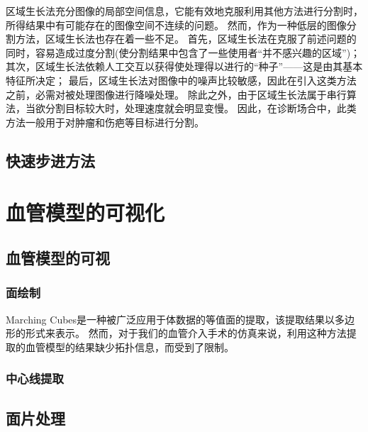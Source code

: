 区域生长法充分图像的局部空间信息，它能有效地克服利用其他方法进行分割时，所得结果中有可能存在的图像空间不连续的问题。
然而，作为一种低层的图像分割方法，区域生长法也存在着一些不足。
首先，区域生长法在克服了前述问题的同时，容易造成过度分割(使分割结果中包含了一些使用者“并不感兴趣的区域”)；
其次，区域生长法依赖人工交互以获得使处理得以进行的“种子”——这是由其基本特征所决定；
最后，区域生长法对图像中的噪声比较敏感，因此在引入这类方法之前，必需对被处理图像进行降噪处理。
除此之外，由于区域生长法属于串行算法，当欲分割目标较大时，处理速度就会明显变慢。
因此，在诊断场合中，此类方法一般用于对肿瘤和伤疤等目标进行分割。

\subsection{快速步进方法}

\cite{Sethian1996FastMarching} \cite{Osher1988LevelSet}


\section{血管模型的可视化}

\subsection{血管模型的可视}

\subsubsection{面绘制}

Marching Cubes\cite{Lorensen1987MC}是一种被广泛应用于体数据的等值面的提取，该提取结果以多边形的形式来表示。
然而，对于我们的血管介入手术的仿真来说，利用这种方法提取的血管模型的结果缺少拓扑信息，而受到了限制\cite{Nowinski2001NeuroCath}\cite{Hahn1998GWU}。

\subsubsection{中心线提取}

\subsection{面片处理}

